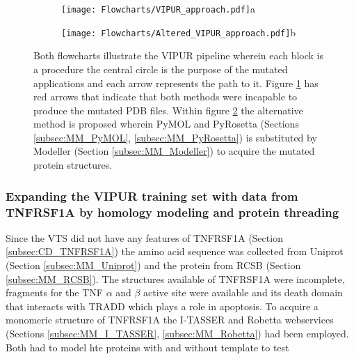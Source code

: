 	\begin{figure}[!ht]
		\centering
		\begin{subfigure}{0.45\textwidth}
			\texttt{[image: Flowcharts/VIPUR\_approach.pdf]}{a}
			\label{fig:RES_VIPUR_approach}
		\end{subfigure}
		\begin{subfigure}{0.45\textwidth}
			\texttt{[image: Flowcharts/Altered\_VIPUR\_approach.pdf]}{b}
			\label{fig:RES_Altered_VIPUR_approach}
		\end{subfigure}
		\caption[Flowcharts VIPUR pipeline and altered VIPUR pipeline]{Both flowcharts illustrate the VIPUR pipeline wherein each block is a procedure the central circle is the purpose of the mutated applications and each arrow represents the path to it. Figure \ref{fig:RES_VIPUR_approach} has red arrows that indicate that both methods were incapable to produce the mutated PDB files. Within figure \ref{fig:RES_Altered_VIPUR_approach} the alternative method is proposed wherein PyMOL and PyRosetta (Sections \ref{subsec:MM_PyMOL}, \ref{subsec:MM_PyRosetta}) is substituted by Modeller (Section \ref{subsec:MM_Modeller}) to acquire the mutated protein structures.}

		\label{fig:Flowcharts_of_old_and_altered_VIPUR}
	\end{figure}
	\label{subsubsec:RES_Incompatibility}
	\newpage
	
	\subsubsection{Expanding the VIPUR training set with data from TNFRSF1A by homology modeling and protein threading}
	Since the VTS did not have any features of TNFRSF1A (Section \ref{subsec:CD_TNFRSF1A}) the amino acid sequence was collected from Uniprot (Section \ref{subsec:MM_Uniprot}) and the protein from RCSB (Section \ref{subsec:MM_RCSB}). The structures available of TNFRSF1A were incomplete, fragments for the TNF $\alpha$ and $\beta$ active site were available and its death domain that interacts with TRADD which plays a role in apoptosis. To acquire a monomeric structure of TNFRSF1A the I-TASSER and Robetta webservices (Sections \ref{subsec:MM_I_TASSER}, \ref{subsec:MM_Robetta}) had been employed. Both had to model hte proteins with and without template to test  
	
